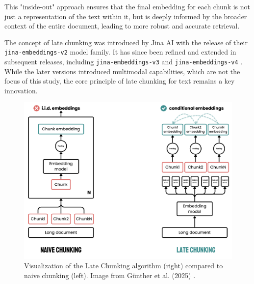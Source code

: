 This "inside-out" approach ensures that the final embedding for each chunk is not just a representation of the text within it, but is deeply informed by the broader context of the entire document, leading to more robust and accurate retrieval.

The concept of late chunking was introduced by Jina AI with the release of their \texttt{jina-embeddings-v2} model family. It has since been refined and extended in subsequent releases, including \texttt{jina-embeddings-v3} \autocite{sturua2024jinaembeddingsv3multilingualembeddingstask} and \texttt{jina-embeddings-v4} \autocite{günther2025jinaembeddingsv4universalembeddingsmultimodal}. While the later versions introduced multimodal capabilities, which are not the focus of this study, the core principle of late chunking for text remains a key innovation.

\begin{figure}[!htbp]
    \centering
    \includegraphics[width=\textwidth]{images/chapter3/late_chunking.png}
    \caption{Visualization of the Late Chunking algorithm (right) compared to naive chunking (left). Image from Günther et al. (2025) \autocite{günther2025latechunkingcontextualchunk}.}
    \label{fig:late_chunking}
\end{figure}

